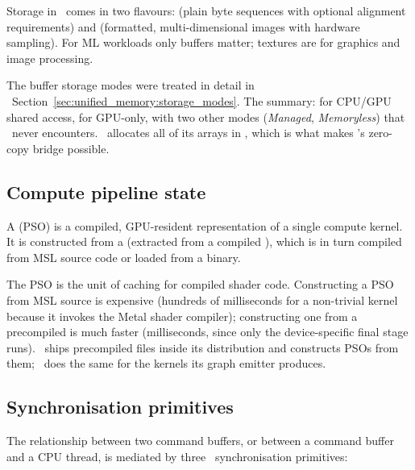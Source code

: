Storage in \Metal\ comes in two flavours:  (plain
byte sequences with optional alignment requirements) and
 (formatted, multi-dimensional images with hardware
sampling). For ML workloads only buffers matter; textures are for
graphics and image processing.

The buffer storage modes were treated in detail in
~Section~\ref{sec:unified_memory:storage_modes}.
The summary:  for CPU/GPU shared
access,  for GPU-only, with two
other modes (\emph{Managed}, \emph{Memoryless}) that \Lucid\
never encounters. \MLX\ allocates all of its arrays in
, which is what makes \Lucid's
zero-copy bridge possible.

\subsection{Compute pipeline state}
\label{ssec:metal_mpsgraph:pso}

A  (PSO) is a compiled, GPU-resident
representation of a single compute kernel. It is constructed from a
\code{MTLFunction} (extracted from a compiled \code{MTLLibrary}),
which is in turn compiled from MSL source code or loaded from a
 binary.

The PSO is the unit of caching for compiled shader code. Constructing
a PSO from MSL source is expensive (hundreds of milliseconds for a
non-trivial kernel because it invokes the Metal shader compiler);
constructing one from a precompiled  is much faster
(milliseconds, since only the device-specific final stage runs).
\MLX\ ships precompiled \code{.metallib} files inside its
distribution and constructs PSOs from them; \MPSGraph\ does the same
for the kernels its graph emitter produces.

\subsection{Synchronisation primitives}
\label{ssec:metal_mpsgraph:sync}

The relationship between two command buffers, or between a command
buffer and a CPU thread, is mediated by three \Metal\ synchronisation
primitives:

